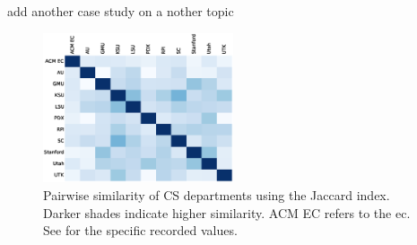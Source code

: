 
add another case study on a nother topic


\begin{figure}
  \includegraphics[width=0.5\textwidth]{figures/10by10heatmap}
  \caption{Pairwise similarity of CS departments using the Jaccard index. Darker shades indicate higher similarity. ACM EC refers to the \acf{ec}. See  for the specific recorded values.\label{fig:heatmap}}
\end{figure}


